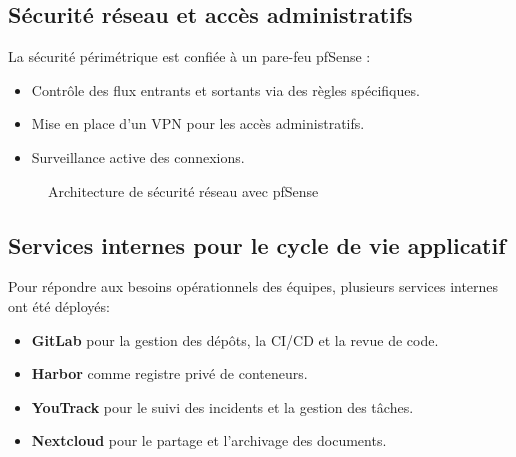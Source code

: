 \subsection{Sécurité réseau et accès administratifs}

La sécurité périmétrique est confiée à un pare-feu pfSense :
\begin{itemize}
	\item Contrôle des flux entrants et sortants via des règles spécifiques.
	\item Mise en place d’un VPN pour les accès administratifs.
	\item Surveillance active des connexions.
\end{itemize}

\begin{figure}[H]
	\centering
	\caption{Architecture de sécurité réseau avec pfSense}
\end{figure}

\subsection{Services internes pour le cycle de vie applicatif}

Pour répondre aux besoins opérationnels des équipes, plusieurs services internes ont été déployés:
\begin{itemize}
	\item \textbf{GitLab} pour la gestion des dépôts, la CI/CD et la revue de code.
	\item \textbf{Harbor} comme registre privé de conteneurs.
	\item \textbf{YouTrack} pour le suivi des incidents et la gestion des tâches.
	\item \textbf{Nextcloud} pour le partage et l’archivage des documents.
\end{itemize}

